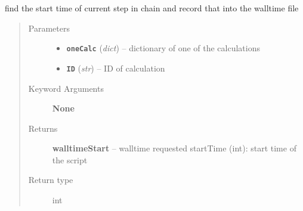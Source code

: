 \documentclass[letterpaper,10pt,english]{sphinxmanual}
\begin{document}

\begin{fulllineitems}
\label{run:run.__grabWalltime}
find the start time of current step in chain and record that into the walltime file
\begin{quote}\begin{description}
\item[{Parameters}] \leavevmode\begin{itemize}
\item {} 
\textbf{\texttt{oneCalc}} (\emph{dict}) -- dictionary of one of the calculations

\item {} 
\textbf{\texttt{ID}} (\emph{str}) -- ID of calculation

\end{itemize}

\item[{Keyword Arguments}] \leavevmode
\textbf{None}

\item[{Returns}] \leavevmode
\textbf{walltimeStart} --
walltime requested
startTime (int): start time of the script

\item[{Return type}] \leavevmode
int

\end{description}\end{quote}

\end{fulllineitems}

\end{document}
